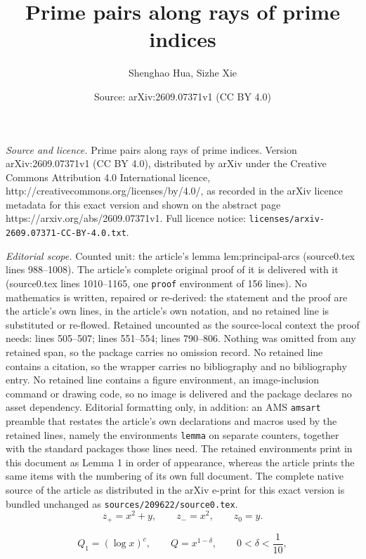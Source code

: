 \documentclass[10pt,a4paper]{amsart}
\title{Prime pairs along rays of prime indices}
\author{Shenghao Hua, Sizhe Xie}
\date{Source: arXiv:2609.07371v1 (CC BY 4.0)}
\begin{document}
\maketitle

\noindent\emph{Source and licence.} Prime pairs along rays of prime indices. Version arXiv:2609.07371v1 (CC BY 4.0), distributed by arXiv under the Creative Commons Attribution 4.0 International licence, http://creativecommons.org/licenses/by/4.0/, as recorded in the arXiv licence metadata for this exact version and shown on the abstract page https://arxiv.org/abs/2609.07371v1. Full licence notice: \texttt{licenses/arxiv-2609.07371-CC-BY-4.0.txt}.\par\smallskip

\noindent\textit{Editorial scope.} Counted unit: the article's lemma lem:principal-arcs (source0.tex lines 988--1008). The article's complete original proof of it is delivered with it (source0.tex lines 1010--1165, one \texttt{proof} environment of 156 lines). No mathematics is written, repaired or re-derived: the statement and the proof are the article's own lines, in the article's own notation, and no retained line is substituted or re-flowed.  Retained uncounted as the source-local context the proof needs: lines 505--507; lines 551--554; lines 790--806.  Nothing was omitted from any retained span, so the package carries no omission record.  No retained line contains a citation, so the wrapper carries no bibliography and no bibliography entry.  No retained line contains a figure environment, an image-inclusion command or drawing code, so no image is delivered and the package declares no asset dependency.  Editorial formatting only, in addition: an AMS \texttt{amsart} preamble that restates the article's own declarations and macros used by the retained lines, namely the environments \texttt{lemma} on separate counters, together with the standard packages those lines need.  The retained environments print in this document as Lemma 1 in order of appearance, whereas the article prints the same items with the numbering of its own full document.  The complete native source of the article as distributed in the arXiv e-print for this exact version is bundled unchanged as \texttt{sources/209622/source0.tex}.
\begin{equation}\label{three-cutoffs}
 z_+=x^2+y,\qquad z_-=x^2,\qquad z_0=y.
\end{equation}

\begin{equation}\label{circle-parameters}
 Q_1=(\log x)^c,\qquad Q=x^{1-\delta},
 \qquad 0<\delta<\frac1{10},
\end{equation}
\end{document}
